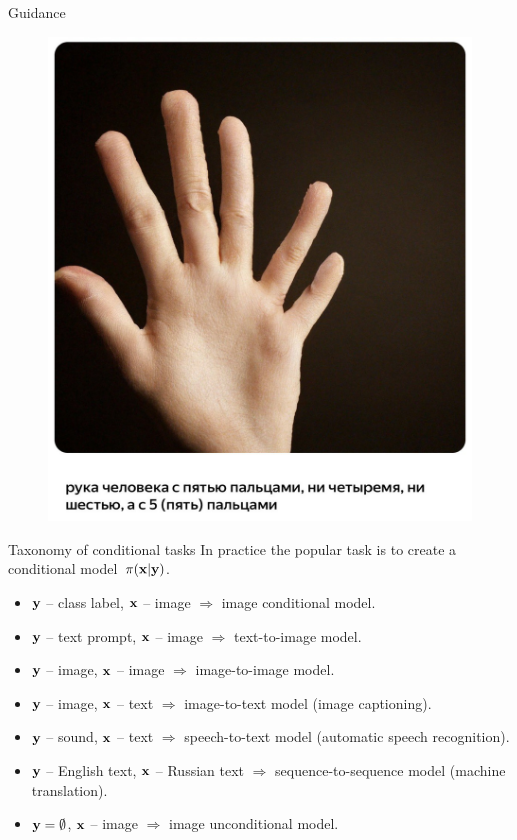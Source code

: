 \begin{frame}{Guidance}
\begin{minipage}[t]{0.5\columnwidth}
\begin{figure}
			\includegraphics[width=0.9\linewidth]{figs/shedevrum2}
		\end{figure}
	\end{minipage}
\end{frame}
\begin{frame}{Taxonomy of conditional tasks}
	In practice the popular task is to create a conditional model~$\pi(\mathbf{x} | \mathbf{y})$. 
	\begin{itemize}
	\item $\mathbf{y}$ -- class label, $\mathbf{x}$ -- image $\Rightarrow$ image conditional model.
	\item $\mathbf{y}$ -- text prompt, $\mathbf{x}$ -- image $\Rightarrow$ text-to-image model.
	\item $\mathbf{y}$ -- image, $\mathbf{x}$ -- image $\Rightarrow$ image-to-image model.
	\item $\mathbf{y}$ -- image, $\mathbf{x}$ -- text $\Rightarrow$ image-to-text model (image captioning).
	\item $\mathbf{y}$ -- sound, $\mathbf{x}$ -- text $\Rightarrow$ speech-to-text model (automatic speech recognition).
	\item $\mathbf{y}$ -- English text, $\mathbf{x}$ -- Russian text $\Rightarrow$ sequence-to-sequence model (machine translation).
	\item $\mathbf{y} = \emptyset$, $\mathbf{x}$ -- image $\Rightarrow$ image unconditional model.
	\end{itemize}
\end{frame}
